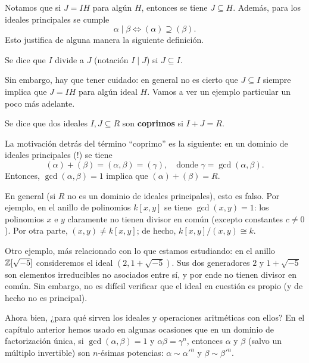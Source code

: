 Notamos que si $J = IH$ para algún $H$, entonces se tiene $J \subseteq H$.
Además, para los ideales principales se cumple
$$\alpha \mid \beta \iff (\alpha) \supseteq (\beta).$$
Esto justifica de alguna manera la siguiente definición.

\begin{definicion}
  Se dice que $I$ divide a $J$ (notación $I \mid J$) si $J \subseteq I$.
\end{definicion}

Sin embargo, hay que tener cuidado: en general no es cierto que $J \subseteq I$
siempre implica que $J = IH$ para algún ideal $H$. Vamos a ver un ejemplo
particular un poco más adelante.

\begin{definicion}
  Se dice que dos ideales $I,J \subseteq R$ son \textbf{coprimos} si
  $I + J = R$.
\end{definicion}

\begin{comentario}
  La motivación detrás del término ``coprimo'' es la siguiente:
  en un dominio de ideales principales (!) se tiene
  \[ (\alpha) + (\beta) = (\alpha,\beta) = (\gamma), \quad
     \text{donde }\gamma = \gcd (\alpha,\beta). \]
  Entonces, $\gcd (\alpha,\beta) = 1$ implica que $(\alpha)+(\beta) = R$.
 
  En general (si $R$ no es un dominio de ideales principales), esto es
  falso. Por ejemplo, en el anillo de polinomios $k[x,y]$ se tiene $\gcd (x,y)
  = 1$: los polinomios $x$ e $y$ claramente no tienen divisor en común (excepto
  constantes $c\ne 0$). Por otra parte, $(x,y) \ne k [x,y]$; de hecho,
  $k [x,y]/(x,y) \cong k$.

  Otro ejemplo, más relacionado con lo que estamos estudiando: en el anillo
  $\mathbb{Z} [\sqrt{-5}]$ consideremos el ideal $(2, 1 + \sqrt{-5})$. Sus dos
  generadores $2$ y $1 + \sqrt{-5}$ son elementos irreducibles no asociados
  entre sí, y por ende no tienen divisor en común. Sin embargo, no es difícil
  verificar que el ideal en cuestión es propio (y de hecho no es principal).
\end{comentario}

Ahora bien, ¿para qué sirven los ideales y operaciones aritméticas con ellos?
En el capítulo anterior hemos usado en algunas ocasiones que en un dominio
de factorización única, si $\gcd (\alpha,\beta) = 1$
y $\alpha\beta = \gamma^n$, entonces $\alpha$ y $\beta$ (salvo un múltiplo
invertible) son $n$-ésimas potencias: $\alpha \sim \alpha'^n$ y
$\beta \sim \beta'^n$.


